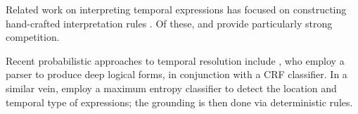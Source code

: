 Related work on interpreting temporal expressions has focused on constructing
	hand-crafted interpretation rules
	\cite{key:2000mani-temporal,key:2003saquete-temporal,key:2004puscasu-temporal,key:2010grover-temporal}.  
Of these,  \cite{key:2010strotgen-temporal} and
	 \cite{key:2012chang-temporal} provide particularly strong
	competition.

Recent probabilistic approaches to temporal resolution include
	,    %
	who employ a parser to produce deep logical forms, in conjunction with
	a CRF classifier.
In a similar vein,
	employ a maximum entropy classifier to detect the location and temporal
	type of expressions; the grounding is then done via deterministic rules.
	
